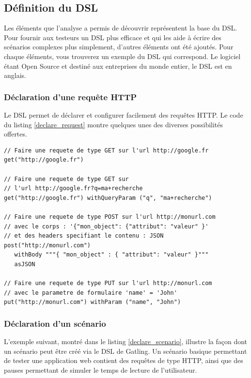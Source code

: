 \subsection{Définition du DSL}
Les éléments que l'analyse a permis de découvrir représentent la base du DSL. Pour fournir aux testeurs un DSL plus efficace et qui les aide à écrire des scénarios complexes plus simplement, d'autres éléments ont été ajoutés. Pour chaque éléments, vous trouverez un exemple du DSL qui correspond. Le logiciel étant Open Source et destiné aux entreprises du monde entier, le DSL est en anglais.


\subsubsection{Déclaration d'une requête HTTP}

Le DSL permet de déclarer et configurer facilement des requêtes HTTP. Le code du listing \ref{declare_request} montre quelques unes des diverses possibilités offertes. 

\begin{lstlisting}[caption={Déclaration d'une requête HTTP},label={declare_request}]
// Faire une requete de type GET sur l'url http://google.fr
get("http://google.fr")

// Faire une requete de type GET sur 
// l'url http://google.fr?q=ma+recherche
get("http://google.fr") withQueryParam ("q", "ma+recherche")

// Faire une requete de type POST sur l'url http://monurl.com
// avec le corps : '{"mon_object": {"attribut": "valeur" }'
// et des headers specifiant le contenu : JSON
post("http://monurl.com")
   withBody """{ "mon_object" : { "attribut": "valeur" }"""
   asJSON

// Faire une requete de type PUT sur l'url http://monurl.com
// avec le parametre de formulaire 'name' = 'John'
put("http://monurl.com") withParam ("name", "John")
\end{lstlisting}

\subsubsection{Déclaration d'un scénario}

L'exemple suivant, montré dans le listing \ref{declare_scenario}, illustre la façon dont un scénario peut être créé via le DSL de Gatling. Un scénario basique permettant de tester une application web contient des requêtes de type HTTP, ainsi que des pauses permettant de simuler le temps de lecture de l'utilisateur.

